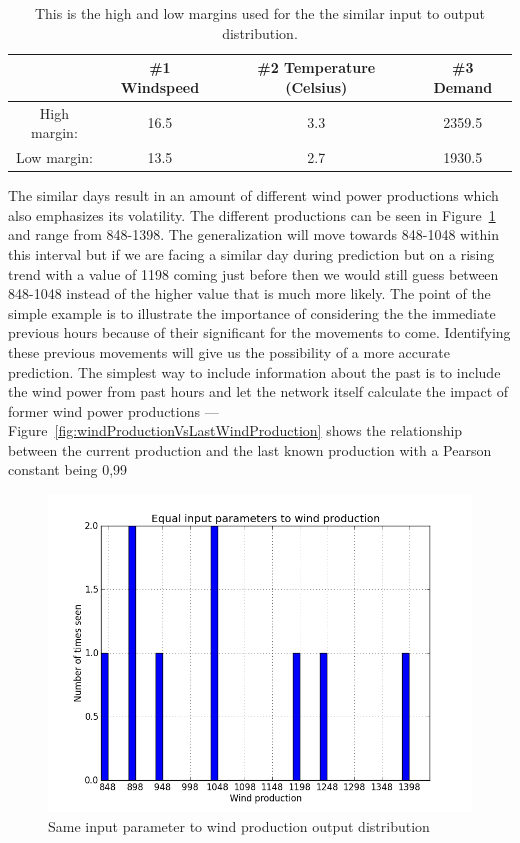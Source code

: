 \begin{table}[H]
\centering  %
\begin{tabular}{|c|c|c|c|} %
\hline
 & \#1 Windspeed & \#2 Temperature (Celsius) & \#3 Demand \\ \hline %
High margin: & 16.5 & 3.3 & 2359.5  \\ \hline
Low margin: & 13.5 & 2.7 & 1930.5 \\ \hline %
\hline %
\end{tabular}
\caption{This is the high and low margins used for the the similar input to output distribution.} %
\label{table:similarHoursLimitsWindProd} %
\end{table}

\noindent The similar days result in an amount of different wind power productions which also emphasizes its volatility. The different productions can be seen in Figure~\ref{fig:inputParameterDistribution} and range from 848-1398. The generalization will move towards 848-1048 within this interval but if we are facing a similar day during prediction but on a rising trend with a value of 1198 coming just before then we would still guess between 848-1048 instead of the higher value that is much more likely. The point of the simple example is to illustrate the importance of considering the the immediate previous hours because of their significant for the movements to come. Identifying these previous movements will give us the possibility of a more accurate prediction. The simplest way to include information about the past is to include the wind power from past hours and let the network itself calculate the impact of former wind power productions --- Figure~\ref{fig:windProductionVsLastWindProduction} shows the relationship between the current production and the last known production with a Pearson constant being 0,99   

\begin{figure}[H]
\centering
\includegraphics[width=0.85\linewidth]{billeder/Equal_wind.png}
\caption{Same input parameter to wind production output distribution}
\label{fig:inputParameterDistribution}
\end{figure}

